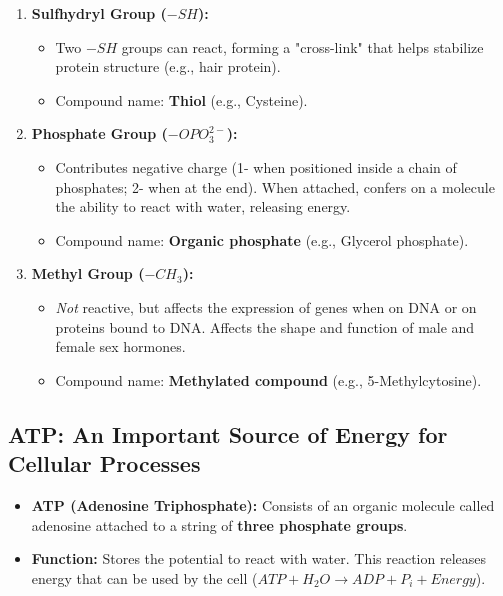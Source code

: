 \documentclass[11pt, a4paper]{article}
\begin{document}
\begin{enumerate}
    \item \textbf{Sulfhydryl Group ($-SH$):}
    \begin{itemize}
        \item Two $-SH$ groups can react, forming a "cross-link" that helps stabilize protein structure (e.g., hair protein).
        \item Compound name: \textbf{Thiol} (e.g., Cysteine).
    \end{itemize}
    \item \textbf{Phosphate Group ($-OPO_3^{2-}$):}
    \begin{itemize}
        \item Contributes negative charge (1- when positioned inside a chain of phosphates; 2- when at the end). When attached, confers on a molecule the ability to react with water, releasing energy.
        \item Compound name: \textbf{Organic phosphate} (e.g., Glycerol phosphate).
    \end{itemize}
    \item \textbf{Methyl Group ($-CH_3$):}
    \begin{itemize}
        \item \textit{Not} reactive, but affects the expression of genes when on DNA or on proteins bound to DNA. Affects the shape and function of male and female sex hormones.
        \item Compound name: \textbf{Methylated compound} (e.g., 5-Methylcytosine).
    \end{itemize}
\end{enumerate}

\subsection*{ATP: An Important Source of Energy for Cellular Processes}
\begin{itemize}
    \item \textbf{ATP (Adenosine Triphosphate):} Consists of an organic molecule called adenosine attached to a string of \textbf{three phosphate groups}.
    \item \textbf{Function:} Stores the potential to react with water. This reaction releases energy that can be used by the cell ($ATP + H_2O \rightarrow ADP + P_i + Energy$).
\end{itemize}
\end{document}
